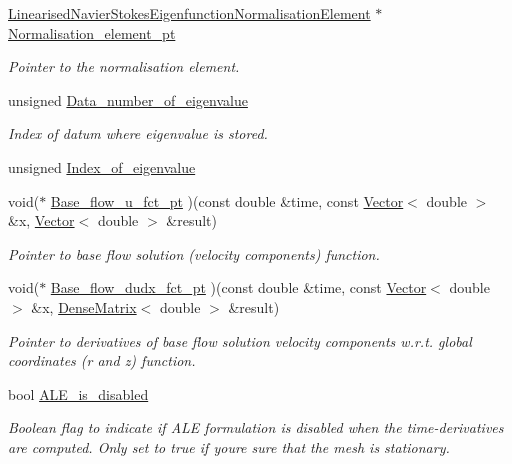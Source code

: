 \begin{DoxyCompactItemize}
\hyperlink{classoomph_1_1LinearisedNavierStokesEigenfunctionNormalisationElement}{Linearised\+Navier\+Stokes\+Eigenfunction\+Normalisation\+Element} $\ast$ \hyperlink{classoomph_1_1LinearisedNavierStokesEquations_a458b34ae6dfb06578ff198cecffcd8ba}{Normalisation\+\_\+element\+\_\+pt}
\begin{DoxyCompactList}\small\item\em Pointer to the normalisation element. \end{DoxyCompactList}\item 
unsigned \hyperlink{classoomph_1_1LinearisedNavierStokesEquations_a34c33d6cc13c53c1b3d456b22d8faa05}{Data\+\_\+number\+\_\+of\+\_\+eigenvalue}
\begin{DoxyCompactList}\small\item\em Index of datum where eigenvalue is stored. \end{DoxyCompactList}\item 
unsigned \hyperlink{classoomph_1_1LinearisedNavierStokesEquations_ac2fce4ec639504d66b9472219da83aad}{Index\+\_\+of\+\_\+eigenvalue}
\item 
void($\ast$ \hyperlink{classoomph_1_1LinearisedNavierStokesEquations_a9bacf9839ab562a2b52e8afc2b882e9d}{Base\+\_\+flow\+\_\+u\+\_\+fct\+\_\+pt} )(const double \&time, const \hyperlink{classoomph_1_1Vector}{Vector}$<$ double $>$ \&x, \hyperlink{classoomph_1_1Vector}{Vector}$<$ double $>$ \&result)
\begin{DoxyCompactList}\small\item\em Pointer to base flow solution (velocity components) function. \end{DoxyCompactList}\item 
void($\ast$ \hyperlink{classoomph_1_1LinearisedNavierStokesEquations_a2ec7f1005e36a5c2029baa2afb4b8a37}{Base\+\_\+flow\+\_\+dudx\+\_\+fct\+\_\+pt} )(const double \&time, const \hyperlink{classoomph_1_1Vector}{Vector}$<$ double $>$ \&x, \hyperlink{classoomph_1_1DenseMatrix}{Dense\+Matrix}$<$ double $>$ \&result)
\begin{DoxyCompactList}\small\item\em Pointer to derivatives of base flow solution velocity components w.\+r.\+t. global coordinates (r and z) function. \end{DoxyCompactList}\item 
bool \hyperlink{classoomph_1_1LinearisedNavierStokesEquations_a654d71824067f1c950e48dd4dca9be1f}{A\+L\+E\+\_\+is\+\_\+disabled}
\begin{DoxyCompactList}\small\item\em Boolean flag to indicate if A\+LE formulation is disabled when the time-\/derivatives are computed. Only set to true if you\textquotesingle{}re sure that the mesh is stationary. \end{DoxyCompactList}\end{DoxyCompactItemize}
